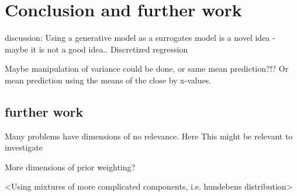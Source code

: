 \chapter{Conclusion and further work}

discussion: Using a generative model as a surrogates model is a novel idea - maybe it is not a good
idea.. Discretized regression

Maybe manipulation of variance could be done, or same mean prediction?!? Or 
mean prediction using the means of the close by x-values. 

\section{further work}
Many problems have dimensions of no relevance. Here This might be relevant to investigate

More dimensions of prior weighting?

<Using mixtures of more complicated components, i.e. hundebens distribution>
 
